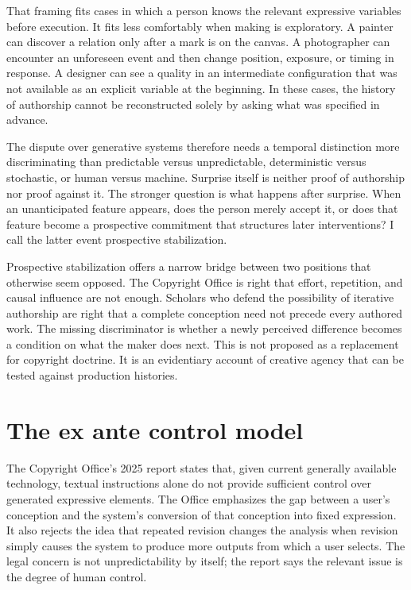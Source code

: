 \documentclass[11pt]{article}
\begin{document}
That framing fits cases in which a person knows the relevant expressive variables before execution. It fits less comfortably when making is exploratory. A painter can discover a relation only after a mark is on the canvas. A photographer can encounter an unforeseen event and then change position, exposure, or timing in response. A designer can see a quality in an intermediate configuration that was not available as an explicit variable at the beginning. In these cases, the history of authorship cannot be reconstructed solely by asking what was specified in advance.

The dispute over generative systems therefore needs a temporal distinction more discriminating than predictable versus unpredictable, deterministic versus stochastic, or human versus machine. Surprise itself is neither proof of authorship nor proof against it. The stronger question is what happens after surprise. When an unanticipated feature appears, does the person merely accept it, or does that feature become a prospective commitment that structures later interventions? I call the latter event prospective stabilization.

Prospective stabilization offers a narrow bridge between two positions that otherwise seem opposed. The Copyright Office is right that effort, repetition, and causal influence are not enough. Scholars who defend the possibility of iterative authorship are right that a complete conception need not precede every authored work. The missing discriminator is whether a newly perceived difference becomes a condition on what the maker does next. This is not proposed as a replacement for copyright doctrine. It is an evidentiary account of creative agency that can be tested against production histories.

\section{The ex ante control model}
The Copyright Office's 2025 report states that, given current generally available technology, textual instructions alone do not provide sufficient control over generated expressive elements. The Office emphasizes the gap between a user's conception and the system's conversion of that conception into fixed expression. It also rejects the idea that repeated revision changes the analysis when revision simply causes the system to produce more outputs from which a user selects. The legal concern is not unpredictability by itself; the report says the relevant issue is the degree of human control.\cite{usco2025copyrightability}
\end{document}
